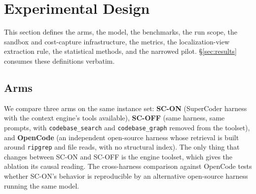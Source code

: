 %
%

\section{Experimental Design}
\label{sec:design}

This section defines the arms, the model, the benchmarks, the run scope, the sandbox and
cost-capture infrastructure, the metrics, the localization-view extraction rule, the
statistical methods, and the narrowed pilot. \S\ref{sec:results} consumes these
definitions verbatim.

\subsection{Arms}
\label{sec:design-arms}

We compare three arms on the same instance set: \textbf{SC-ON} (SuperCoder harness with
the context engine's tools available), \textbf{SC-OFF} (same harness, same prompts, with
\texttt{codebase\_search} and \texttt{codebase\_graph} removed from the toolset), and
\textbf{OpenCode} (an independent open-source harness whose retrieval is built around
\texttt{ripgrep} and file reads, with no structural index). The only thing
that changes between SC-ON and SC-OFF is the engine toolset, which gives the ablation its
causal reading. The cross-harness comparison against OpenCode tests whether SC-ON's
behavior is reproducible by an alternative open-source harness running the same model.


